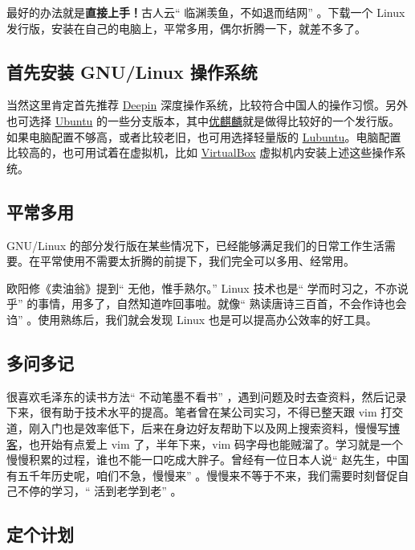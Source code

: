 \documentclass[doctor,openright,twoside]{sjtuthesis}
\theoremstyle{plain}
\theoremstyle{definition}
\theoremstyle{remark}
\theoremstyle{ocrenumbox}
\theoremstyle{plain}
\begin{document}
最好的办法就是\textbf{直接上手！}古人云`` 临渊羡鱼，不如退而结网'' 。下载一个 Linux 发行版，安装在自己的电脑上，平常多用，偶尔折腾一下，就差不多了。

\hypertarget{gnulinux--2}{%
\subsection{首先安装 GNU/Linux 操作系统}\label{gnulinux--2}}

当然这里肯定首先推荐 \href{https://www.deepin.org/}{Deepin} 深度操作系统，比较符合中国人的操作习惯。另外也可选择 \href{https://www.ubuntu.com/global}{Ubuntu} 的一些分支版本，其中\href{https://www.ubuntukylin.com/}{优麒麟}就是做得比较好的一个发行版。 如果电脑配置不够高，或者比较老旧，也可用选择轻量版的 \href{https://lubuntu.net/}{Lubuntu}。电脑配置比较高的，也可用试着在虚拟机，比如 \href{https://www.virtualbox.org/}{VirtualBox} 虚拟机内安装上述这些操作系统。

\hypertarget{section-2}{%
\subsection{平常多用}\label{section-2}}

GNU/Linux 的部分发行版在某些情况下，已经能够满足我们的日常工作生活需要。在平常使用不需要太折腾的前提下，我们完全可以多用、经常用。

欧阳修《卖油翁》提到`` 无他，惟手熟尔。'' Linux 技术也是`` 学而时习之，不亦说乎'' 的事情，用多了，自然知道咋回事啦。就像`` 熟读唐诗三百首，不会作诗也会诌'' 。使用熟练后，我们就会发现 Linux 也是可以提高办公效率的好工具。

\hypertarget{section-3}{%
\subsection{多问多记}\label{section-3}}

很喜欢毛泽东的读书方法`` 不动笔墨不看书'' ，遇到问题及时去查资料，然后记录下来，很有助于技术水平的提高。笔者曾在某公司实习，不得已整天跟 vim 打交道，刚入门也是效率低下，后来在身边好友帮助下以及网上搜索资料，慢慢写\href{https://my.oschina.net/bubifengyun/blog/163516}{博客}，也开始有点爱上 vim 了，半年下来，vim 码字母也能贼溜了。学习就是一个慢慢积累的过程，谁也不能一口吃成大胖子。曾经有一位日本人说`` 赵先生，中国有五千年历史呢，咱们不急，慢慢来'' 。慢慢来不等于不来，我们需要时刻督促自己不停的学习，`` 活到老学到老'' 。

\hypertarget{section-4}{%
\subsection{定个计划}\label{section-4}}
\end{document}
